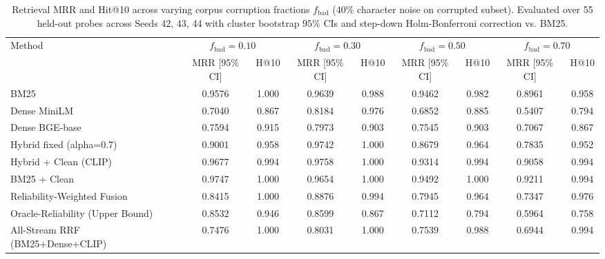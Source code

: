 \begin{table}[t]
\centering\small
\caption{Retrieval MRR and Hit@10 across varying corpus corruption fractions $f_{\text{bad}}$ ($40\%$ character noise on corrupted subset). Evaluated over 55 held-out probes across Seeds 42, 43, 44 with cluster bootstrap $95\%$ CIs and step-down Holm-Bonferroni correction vs. BM25.}
\label{tab:heterogeneous_noise}
\begin{tabular}{lcccccccc}
\toprule
Method & \multicolumn{2}{c}{$f_{\text{bad}}=0.10$} & \multicolumn{2}{c}{$f_{\text{bad}}=0.30$} & \multicolumn{2}{c}{$f_{\text{bad}}=0.50$} & \multicolumn{2}{c}{$f_{\text{bad}}=0.70$} \\
 & MRR [95\% CI] & H@10 & MRR [95\% CI] & H@10 & MRR [95\% CI] & H@10 & MRR [95\% CI] & H@10 \\
\midrule
BM25 & 0.9576 & 1.000 & 0.9639 & 0.988 & 0.9462 & 0.982 & 0.8961 & 0.958 \\
Dense MiniLM & 0.7040 & 0.867 & 0.8184 & 0.976 & 0.6852 & 0.885 & 0.5407 & 0.794 \\
Dense BGE-base & 0.7594 & 0.915 & 0.7973 & 0.903 & 0.7545 & 0.903 & 0.7067 & 0.867 \\
Hybrid fixed (alpha=0.7) & 0.9001 & 0.958 & 0.9742 & 1.000 & 0.8679 & 0.964 & 0.7835 & 0.952 \\
Hybrid + Clean (CLIP) & 0.9677 & 0.994 & 0.9758 & 1.000 & 0.9314 & 0.994 & 0.9058 & 0.994 \\
BM25 + Clean & 0.9747 & 1.000 & 0.9654 & 1.000 & 0.9492 & 1.000 & 0.9211 & 0.994 \\
Reliability-Weighted Fusion & 0.8415 & 1.000 & 0.8876 & 0.994 & 0.7945 & 0.964 & 0.7347 & 0.976 \\
Oracle-Reliability (Upper Bound) & 0.8532 & 0.946 & 0.8599 & 0.867 & 0.7112 & 0.794 & 0.5964 & 0.758 \\
All-Stream RRF (BM25+Dense+CLIP) & 0.7476 & 1.000 & 0.8031 & 1.000 & 0.7539 & 0.988 & 0.6944 & 0.994 \\
\bottomrule
\end{tabular}
\end{table}
